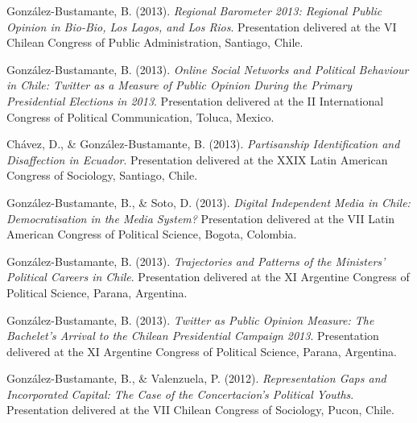 \begin{publications}
\begin{benumerate}{77}
\item{\small González-Bustamante, B. (2013). {\itshape Regional Barometer 2013: Regional Public Opinion in Bio-Bio, Los Lagos, and Los Rios}. Presentation delivered at the VI Chilean Congress of Public Administration, Santiago, Chile.}\vspace{1mm}

\item{\small González-Bustamante, B. (2013). {\itshape Online Social Networks and Political Behaviour in Chile: Twitter as a Measure of Public Opinion During the Primary Presidential Elections in 2013}. Presentation delivered at the II International Congress of Political Communication, Toluca, Mexico.}\vspace{1mm}

\item{\small Chávez, D., \& González-Bustamante, B. (2013). {\itshape Partisanship Identification and Disaffection in Ecuador}. Presentation delivered at the XXIX Latin American Congress of Sociology, Santiago, Chile.}\vspace{1mm}

\item{\small González-Bustamante, B., \& Soto, D. (2013). {\itshape Digital Independent Media in Chile: Democratisation in the Media System?} Presentation delivered at the VII Latin American Congress of Political Science, Bogota, Colombia.}\vspace{1mm}

\item{\small González-Bustamante, B. (2013). {\itshape Trajectories and Patterns of the Ministers' Political Careers in Chile}. Presentation delivered at the XI Argentine Congress of Political Science, Parana, Argentina.}\vspace{1mm}

\item{\small González-Bustamante, B. (2013). {\itshape Twitter as Public Opinion Measure: The Bachelet's Arrival to the Chilean Presidential Campaign 2013}. Presentation delivered at the XI Argentine Congress of Political Science, Parana, Argentina.}\vspace{1mm}

\item{\small González-Bustamante, B., \& Valenzuela, P. (2012). {\itshape Representation Gaps and Incorporated Capital: The Case of the Concertacion's Political Youths}. Presentation delivered at the VII Chilean Congress of Sociology, Pucon, Chile.}\vspace{1mm}


\end{benumerate}
\end{publications}
